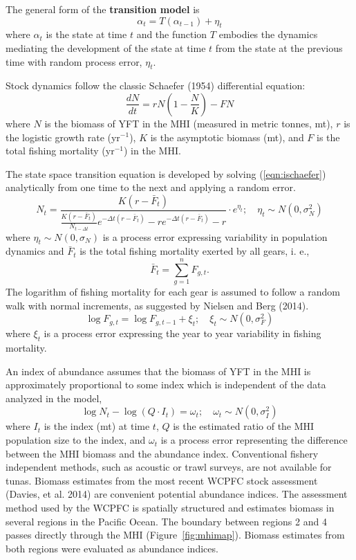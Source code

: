 \documentclass[12pt,letterpaper]{article}
\newcommand\peryr{yr$^{-1}$}
\begin{document}
The general form of the {\bf transition model} is
\begin{equation}
\alpha_t=T(\alpha_{t-1}) + \eta_t
\end{equation}
where $\alpha_t$ is the state at time $t$ and 
the function $T$ embodies the dynamics mediating the
development of the state at time $t$ from the state at the previous
time with random process error, $\eta_t$.

Stock dynamics follow the classic Schaefer (1954) differential equation:
\begin{equation}
\label{eqn:ischaefer}
\frac{dN}{dt} = rN(1-\frac{N}{K}) - FN
\end{equation}
where $N$ is the biomass of YFT in the MHI (measured in metric tonnes, mt), 
$r$ is the logistic growth rate (\peryr),
$K$ is the asymptotic biomass (mt), and
$F$ is the total fishing mortality (\peryr) in the MHI.

The state space transition equation is developed by solving
(\ref{eqn:ischaefer}) analytically from one time to the next and
applying a random error.
\begin{equation}
\label{eqn:intschaeferA}
N_t = \frac{K(r-\bar{F}_t)}{\frac{K(r-\bar{F}_t)}{N_{t-\Delta t}}e^{-\Delta
t(r-\bar{F}_t)}-re^{-\Delta t(r-\bar{F}_t)} -r} \cdot e^{\eta_t};
\quad \eta_t\sim N(0,\sigma^2_N)
\end{equation}
where $\eta_t \sim N(0,\sigma_N)$ is a process error expressing
variability in population dynamics
and $\bar{F}_t$ is the total fishing mortality exerted by all gears, i. e.,
\begin{equation}
\bar{F}_t =\sum_{g=1}^n F_{g,t}.
\end{equation}
The logarithm of fishing mortality for each gear is assumed to
follow a random walk with normal increments, as suggested by Nielsen
and Berg (2014).
\begin{equation}
\label{eqn:Fwalk}
\log F_{g,t} = \log F_{g,t-1} + \xi_t;\quad \xi_t\sim
N(0,\sigma^2_F)
\end{equation}
where  $\xi_t$ is a process error expressing the year to year
variability in fishing mortality.

An index of abundance assumes that the biomass of YFT in the MHI
is approximately proportional to some index which is independent of
the data analyzed in the model,
\begin{equation}
\log N_t - \log (Q\cdot I_t) = \omega_t;\quad \omega_t\sim N(0,\sigma^2_I)
\label{eqn:index}
\end{equation}
where
$I_t$ is the index (mt) at time $t$,
$Q$ is the estimated ratio of the MHI population size to the index,
and $\omega_t$ is a process error representing the difference
between the MHI biomass and the abundance index. 
Conventional fishery independent methods, such as acoustic or trawl
surveys, are not available for tunas. 
Biomass estimates from the most recent WCPFC stock
assessment (Davies, et al. 2014) are convenient potential abundance
indices. The assessment method used by the
WCPFC is spatially structured and estimates biomass in several regions
in the Pacific Ocean. The boundary between regions 2 and 4 passes
directly through the MHI (Figure~\ref{fig:mhimap}).
Biomass estimates from both regions were evaluated as abundance indices.
\end{document}
